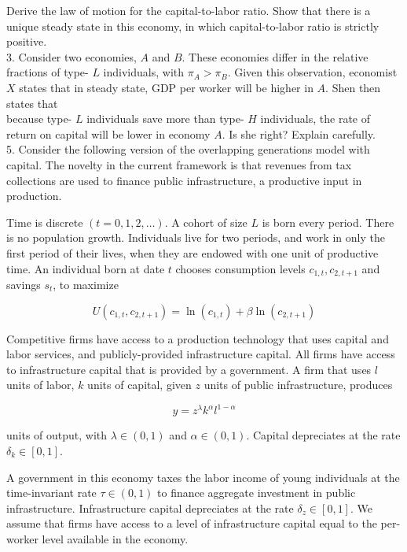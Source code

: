 \documentclass[10pt]{article}
\begin{document}
Derive the law of motion for the capital-to-labor ratio. Show that there is a unique steady state in this economy, in which capital-to-labor ratio is strictly positive.\\
3. Consider two economies, $A$ and $B$. These economies differ in the relative fractions of type- $L$ individuals, with $\pi_{A}>\pi_{B}$. Given this observation, economist $X$ states that in steady state, GDP per worker will be higher in $A$. Shen then states that\\
because type- $L$ individuals save more than type- $H$ individuals, the rate of return on capital will be lower in economy $A$. Is she right? Explain carefully.\\
5. Consider the following version of the overlapping generations model with capital. The novelty in the current framework is that revenues from tax collections are used to finance public infrastructure, a productive input in production.

Time is discrete $(t=0,1,2, \ldots)$. A cohort of size $L$ is born every period. There is no population growth. Individuals live for two periods, and work in only the first period of their lives, when they are endowed with one unit of productive time. An individual born at date $t$ chooses consumption levels $c_{1, t}, c_{2, t+1}$ and savings $s_{t}$, to maximize

$$
U\left(c_{1, t}, c_{2, t+1}\right)=\ln \left(c_{1, t}\right)+\beta \ln \left(c_{2, t+1}\right)
$$

Competitive firms have access to a production technology that uses capital and labor services, and publicly-provided infrastructure capital. All firms have access to infrastructure capital that is provided by a government. A firm that uses $l$ units of labor, $k$ units of capital, given $z$ units of public infrastructure, produces

$$
y=z^{\lambda} k^{\alpha} l^{1-\alpha}
$$

units of output, with $\lambda \in(0,1)$ and $\alpha \in(0,1)$. Capital depreciates at the rate $\delta_{k} \in [0,1]$.

A government in this economy taxes the labor income of young individuals at the time-invariant rate $\tau \in(0,1)$ to finance aggregate investment in public infrastructure. Infrastructure capital depreciates at the rate $\delta_{z} \in[0,1]$. We assume that firms have access to a level of infrastructure capital equal to the per-worker level available in the economy.
\end{document}
